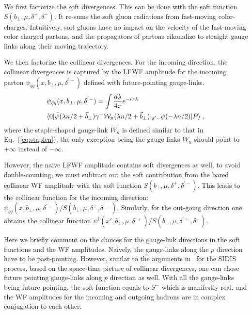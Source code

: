 We first factorize the soft divergences. This can be done with the soft function $S(b_\perp,\mu,\delta^+,\delta^-)$. It re-sums the soft gluon radiations from fast-moving color-charges. Intuitively, soft gluons have no impact on the velocity of the fast-moving color charged partons, and the propagators of partons eikonalize to straight gauge links along their moving trajectory.

We then factorize the collinear divergences. For the incoming direction, the collinear divergences is captured by the LFWF amplitude for the incoming parton $\psi_{\bar q q}(x,b_\perp,\mu,\delta^{'-})$ defined with future-pointing gauge-links.
\begin{align}
	&\psi_{\bar q q}(x,b_\perp,\mu,\delta^{'-})=\int\frac{d\lambda}{4\pi}e^{-ix\lambda}\\
	&\langle 0|\bar \psi(\lambda n/2 +\vec{b}_\perp)\gamma^+{\cal W}_n(\lambda n/2+\vec{b}_\perp)|_{\delta^{'-}}\psi(-\lambda n/2)|P\rangle \ ,\nonumber
\end{align}
where the staple-shaped gauge-link $W_n$ is defined similar to that in Eq.~(\ref{eq:staplen}), the only exception being the gauge-links $W_n$ should point to $+\infty$ instead of  $-\infty$.

However, the naive LFWF amplitude contains soft divergences as well, to avoid double-counting, we must subtract out the soft contribution from the bared collinear WF amplitude with the soft function $S(b_\perp,\mu,\delta^+,\delta^{'-})$. This leads to the collinear function for the incoming direction: $\psi_{\bar q q}(x,b_\perp,\mu,\delta^{'-})/S(b_\perp,\mu,\delta^+,\delta^{'-})$. Similarly, for the out-going direction one obtains the collinear function $\psi^{\dagger}(x',b_\perp,\mu,\delta^{'+})/S(b_\perp,\mu,\delta^{'+},\delta^{-})$.

Here we briefly comment on the choices for the gauge-link directions in the soft functions and the WF amplitudes. Naively, the gauge-links along the $p$ direction have to be past-pointing. However, similar to the arguments in~\cite{Collins:2004nx} for the SIDIS process, based on the space-time picture of collinear divergences, one can chose future pointing gauge-links along $p$ direction as well. With all the gauge-links being future pointing, the soft function equals to $S^-$ which is manifestly real, and the WF amplitudes for the incoming and outgoing hadrons are in complex conjugation to each other.

